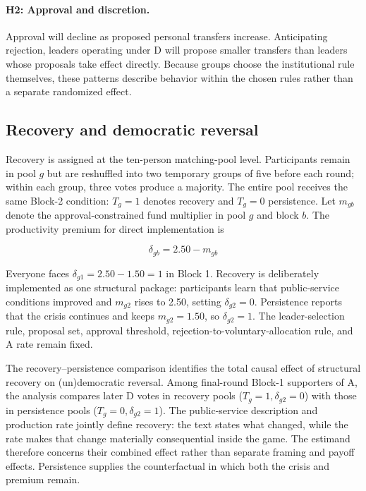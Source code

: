 \documentclass[11pt,a4paper]{article}
\newcommand{\Dproc}{\textsf{D}}
\newcommand{\Aproc}{\textsf{A}}
\begin{document}
\paragraph{H2: Approval and discretion.} Approval will decline as proposed personal transfers increase. Anticipating rejection, leaders operating under \Dproc{} will propose smaller transfers than leaders whose proposals take effect directly. Because groups choose the institutional rule themselves, these patterns describe behavior within the chosen rules rather than a separate randomized effect.

\subsection{Recovery and democratic reversal}

Recovery is assigned at the ten-person matching-pool level. Participants remain in pool \(g\) but are reshuffled into two temporary groups of five before each round; within each group, three votes produce a majority. The entire pool receives the same Block-2 condition: \(T_g=1\) denotes recovery and \(T_g=0\) persistence. Let \(m_{gb}\) denote the approval-constrained fund multiplier in pool \(g\) and block \(b\). The productivity premium for direct implementation is

\begin{equation}
\delta_{gb}=2.50-m_{gb}
\label{eq:productivity-premium}
\end{equation}

Everyone faces \(\delta_{g1}=2.50-1.50=1\) in Block 1. Recovery is deliberately implemented as one structural package: participants learn that public-service conditions improved and \(m_{g2}\) rises to 2.50, setting \(\delta_{g2}=0\). Persistence reports that the crisis continues and keeps \(m_{g2}=1.50\), so \(\delta_{g2}=1\). The leader-selection rule, proposal set, approval threshold, rejection-to-voluntary-allocation rule, and \Aproc{} rate remain fixed.

The recovery--persistence comparison identifies the total causal effect of structural recovery on (un)democratic reversal. Among final-round Block-1 supporters of \Aproc{}, the analysis compares later \Dproc{} votes in recovery pools (\(T_g=1,\delta_{g2}=0\)) with those in persistence pools (\(T_g=0,\delta_{g2}=1\)). The public-service description and production rate jointly define recovery: the text states what changed, while the rate makes that change materially consequential inside the game. The estimand therefore concerns their combined effect rather than separate framing and payoff effects. Persistence supplies the counterfactual in which both the crisis and premium remain.
\end{document}
